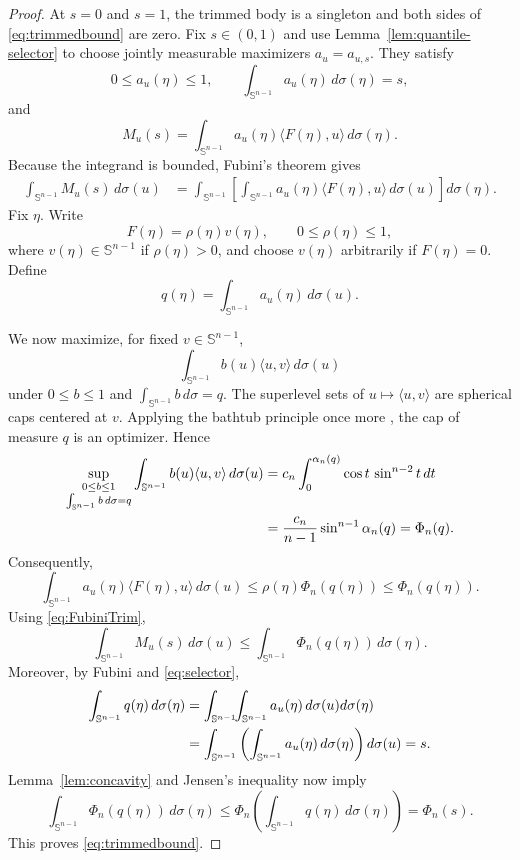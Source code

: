 \documentclass[11pt,reqno]{amsart}
\theoremstyle{remark}
\begin{document}
\begin{proof}
At $s=0$ and $s=1$, the trimmed body is a singleton and both sides of
\eqref{eq:trimmedbound} are zero.  Fix $s\in(0,1)$ and use
Lemma~\ref{lem:quantile-selector} to choose jointly measurable maximizers
$a_u=a_{u,s}$.  They satisfy
\begin{equation}\label{eq:selector}
 0\le a_u(\eta)\le1,\qquad
 \int_{\mathbb S^{n-1}} a_u(\eta)\,d\sigma(\eta)=s,
\end{equation}
and
\[
 M_u(s)=\int_{\mathbb S^{n-1}} a_u(\eta)\langle F(\eta),u\rangle\,d\sigma(\eta).
\]
Because the integrand is bounded, Fubini's theorem gives
\begin{align}
 \int_{\mathbb S^{n-1}}M_u(s)\,d\sigma(u)
 &=
 \int_{\mathbb S^{n-1}}
 \left[
 \int_{\mathbb S^{n-1}}
 a_u(\eta)\langle F(\eta),u\rangle\,d\sigma(u)
 \right]d\sigma(\eta).
 \label{eq:FubiniTrim}
\end{align}
Fix $\eta$.  Write
\[
 F(\eta)=\rho(\eta)v(\eta),
 \qquad 0\le\rho(\eta)\le1,
\]
where $v(\eta)\in\mathbb S^{n-1}$ if $\rho(\eta)>0$, and choose
$v(\eta)$ arbitrarily if $F(\eta)=0$.  Define
\begin{equation}\label{eq:qeta}
 q(\eta)=\int_{\mathbb S^{n-1}}a_u(\eta)\,d\sigma(u).
\end{equation}

We now maximize, for fixed $v\in\mathbb S^{n-1}$,
\[
 \int_{\mathbb S^{n-1}}b(u)\langle u,v\rangle\,d\sigma(u)
\]
under $0\le b\le1$ and $\int_{\mathbb S^{n-1}} b\,d\sigma=q$.  The superlevel sets of
$u\mapsto\langle u,v\rangle$ are spherical caps centered at $v$.
Applying the bathtub principle once more
\cite[Theorem~1.14]{LiebLoss}, the cap of measure $q$ is an optimizer.  Hence
\begin{align}
 \sup_{\substack{0\le b\le1\\\int_{\mathbb S^{n-1}} b\,d\sigma=q}}
 \int_{\mathbb S^{n-1}} b(u)\langle u,v\rangle\,d\sigma(u)
 &=
 c_n\int_0^{\alpha_n(q)}
 \cos t\,\sin^{n-2}t\,dt \notag\\
 &=
 \frac{c_n}{n-1}
 \sin^{n-1}\alpha_n(q)
 =\Phi_n(q).
 \label{eq:capextremal}
\end{align}
Consequently,
\[
 \int_{\mathbb S^{n-1}} a_u(\eta)\langle F(\eta),u\rangle\,d\sigma(u)
 \le
 \rho(\eta)\Phi_n(q(\eta))
 \le
 \Phi_n(q(\eta)).
\]
Using \eqref{eq:FubiniTrim},
\begin{equation}\label{eq:preJensen}
 \int_{\mathbb S^{n-1}} M_u(s)\,d\sigma(u)
 \le
 \int_{\mathbb S^{n-1}} \Phi_n(q(\eta))\,d\sigma(\eta).
\end{equation}
Moreover, by Fubini and \eqref{eq:selector},
\begin{align}
 \int_{\mathbb S^{n-1}} q(\eta)\,d\sigma(\eta)
 &=
 \int_{\mathbb S^{n-1}}\!\!\int_{\mathbb S^{n-1}} a_u(\eta)\,d\sigma(u)d\sigma(\eta) \notag\\
 &=
 \int_{\mathbb S^{n-1}}
 \left(\int_{\mathbb S^{n-1}} a_u(\eta)\,d\sigma(\eta)\right)d\sigma(u)
 =s.
 \label{eq:qmean}
\end{align}
Lemma~\ref{lem:concavity} and Jensen's inequality now imply
\[
 \int_{\mathbb S^{n-1}} \Phi_n(q(\eta))\,d\sigma(\eta)
 \le
 \Phi_n\!\left(\int_{\mathbb S^{n-1}} q(\eta)\,d\sigma(\eta)\right)
 =
 \Phi_n(s).
\]
This proves \eqref{eq:trimmedbound}.


\end{proof}
\end{document}
